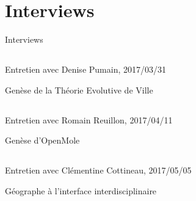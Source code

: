 






\section{Interviews}{Interviews}

\label{app:sec:interviews}



\subsection{}{Entretien avec Denise Pumain, 2017/03/31}

Genèse de la Théorie Evolutive de Ville

\subsection{}{Entretien avec Romain Reuillon, 2017/04/11}

Genèse d'OpenMole

\subsection{}{Entretien avec Clémentine Cottineau, 2017/05/05}

Géographe à l'interface interdisciplinaire















